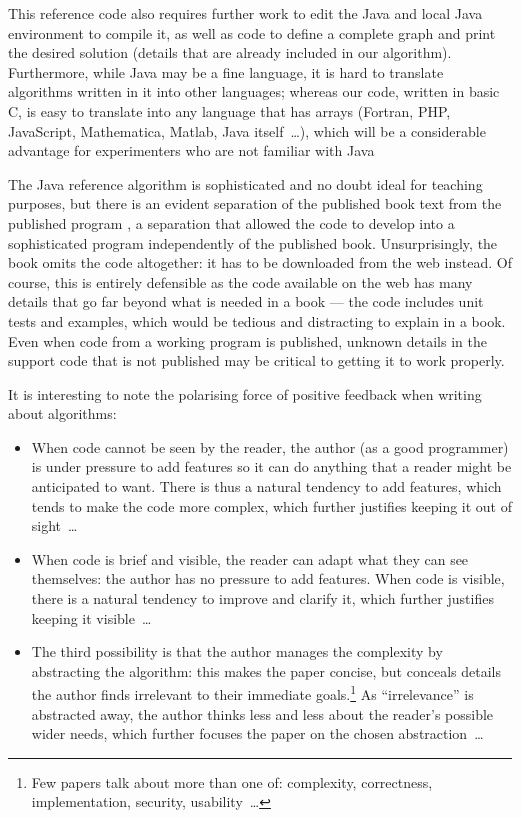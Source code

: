 \documentclass[preprint,times]{elsarticle}
\begin{document}
This reference code also requires further work to edit the Java and local Java environment to compile it, as well as code to define a complete graph and print the desired solution (details that are already included in our algorithm). Furthermore, while Java may be a fine language, it is hard to translate algorithms written in it into other languages; whereas our code, written in basic C, is easy to translate into any language that has arrays (Fortran, PHP, JavaScript, Mathematica, Matlab, Java itself~\ldots), which will be a considerable advantage for experimenters who are not familiar with Java

The Java reference algorithm is sophisticated and no doubt ideal for teaching purposes, but there is an evident separation of the published book text \cite{sedgewickbook} from the published program \cite{sedgewickcode}, a separation that allowed the code to develop into a sophisticated program independently of the published book. Unsurprisingly, the book omits the code altogether: it has to be downloaded from the web instead. Of course, this is entirely defensible as the code available on the web has many details that go far beyond what is needed in a book --- the code includes unit tests and examples, which would be tedious and distracting to explain in a book. Even when code from a working program is published, unknown details in the support code that is not published may be critical to getting it to work properly.

It is interesting to note the polarising force of positive feedback when writing about algorithms:

\begin{itemize}\raggedright 
\item When code cannot be seen by the reader, the author (as a good programmer) is under pressure to add features so it can do anything that a reader might be anticipated to want. There is thus a natural tendency to add features, which tends to make the code more complex, which further justifies keeping it out of sight~\ldots 

\item When code is brief and visible, the reader can adapt what they can see themselves: the author has no pressure to add features. When code is visible, there is a natural tendency to improve and clarify it, which further justifies keeping it visible~\ldots 

\item The third possibility is that the author manages the complexity by abstracting the algorithm: this makes the paper concise, but conceals details the author finds irrelevant to their immediate goals.\footnote{Few papers talk about more than one of: complexity, correctness, implementation, security, usability~\ldots} As ``irrelevance'' is abstracted away, the author thinks less and less about the reader's possible wider needs, which further focuses the paper on the chosen abstraction~\ldots
\end{itemize}
\end{document}
